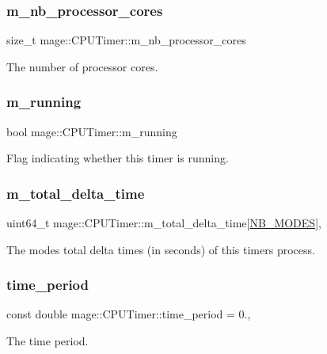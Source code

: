 \subsubsection{\texorpdfstring{m\+\_\+nb\+\_\+processor\+\_\+cores}{m\_nb\_processor\_cores}}
{\footnotesize\ttfamily size\+\_\+t mage\+::\+C\+P\+U\+Timer\+::m\+\_\+nb\+\_\+processor\+\_\+cores\hspace{0.3cm}{\ttfamily [private]}}

The number of processor cores. \hypertarget{classmage_1_1_c_p_u_timer_a7190afa453085b7bbd7cb76ff6bb62f2}{}\label{classmage_1_1_c_p_u_timer_a7190afa453085b7bbd7cb76ff6bb62f2} 
\subsubsection{\texorpdfstring{m\+\_\+running}{m\_running}}
{\footnotesize\ttfamily bool mage\+::\+C\+P\+U\+Timer\+::m\+\_\+running\hspace{0.3cm}{\ttfamily [private]}}

Flag indicating whether this timer is running. \hypertarget{classmage_1_1_c_p_u_timer_aa4b96eea0eb0cc3e5d5a4bb7a343a4f6}{}\label{classmage_1_1_c_p_u_timer_aa4b96eea0eb0cc3e5d5a4bb7a343a4f6} 
\subsubsection{\texorpdfstring{m\+\_\+total\+\_\+delta\+\_\+time}{m\_total\_delta\_time}}
{\footnotesize\ttfamily uint64\+\_\+t mage\+::\+C\+P\+U\+Timer\+::m\+\_\+total\+\_\+delta\+\_\+time\mbox{[}\hyperlink{classmage_1_1_c_p_u_timer_a5adc0497956723a35534dfeb66fa7789ab63e6023ec0bea89568ebb2b98728b77}{N\+B\+\_\+\+M\+O\+D\+ES}\mbox{]}\hspace{0.3cm}{\ttfamily [mutable]}, {\ttfamily [private]}}

The modes\textquotesingle{} total delta times (in seconds) of this timer\textquotesingle{}s process. \hypertarget{classmage_1_1_c_p_u_timer_a9ff7683150a07f2040b660fc3775337b}{}\label{classmage_1_1_c_p_u_timer_a9ff7683150a07f2040b660fc3775337b} 
\subsubsection{\texorpdfstring{time\+\_\+period}{time\_period}}
{\footnotesize\ttfamily const double mage\+::\+C\+P\+U\+Timer\+::time\+\_\+period = 0.\hspace{0.3cm}{\ttfamily [static]}, {\ttfamily [private]}}

The time period. 